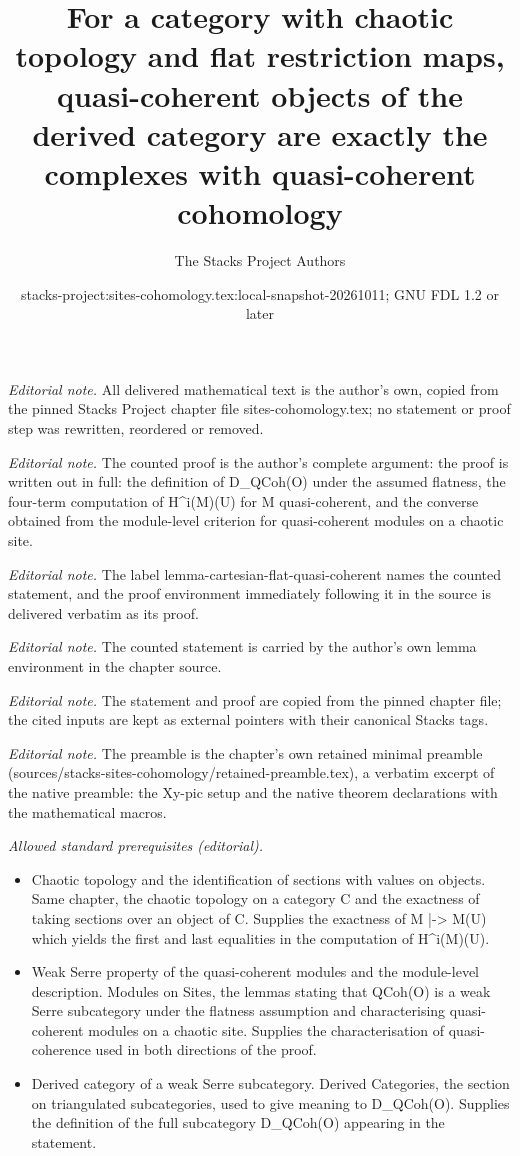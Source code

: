 \documentclass[10pt,a4paper]{amsart}
\title{For a category with chaotic topology and flat restriction maps, quasi-coherent objects of the derived category are exactly the complexes with quasi-coherent cohomology}
\author{The Stacks Project Authors}
\date{stacks-project:sites-cohomology.tex:local-snapshot-20261011; GNU FDL 1.2 or later}
\theoremstyle{plain}
\theoremstyle{definition}
\theoremstyle{remark}
\numberwithin{equation}{subsection}
\begin{document}
\maketitle
\noindent\textit{Editorial note.} All delivered mathematical text is the author's own, copied from the pinned Stacks Project chapter file sites-cohomology.tex; no statement or proof step was rewritten, reordered or removed.\par\medskip
\noindent\textit{Editorial note.} The counted proof is the author's complete argument: the proof is written out in full: the definition of D\_QCoh(O) under the assumed flatness, the four-term computation of H\textasciicircum{}i(M)(U) for M quasi-coherent, and the converse obtained from the module-level criterion for quasi-coherent modules on a chaotic site.\par\medskip
\noindent\textit{Editorial note.} The label lemma-cartesian-flat-quasi-coherent names the counted statement, and the proof environment immediately following it in the source is delivered verbatim as its proof.\par\medskip
\noindent\textit{Editorial note.} The counted statement is carried by the author's own lemma environment in the chapter source.\par\medskip
\noindent\textit{Editorial note.} The statement and proof are copied from the pinned chapter file; the cited inputs are kept as external pointers with their canonical Stacks tags.\par\medskip
\noindent\textit{Editorial note.} The preamble is the chapter's own retained minimal preamble (sources/stacks-sites-cohomology/retained-preamble.tex), a verbatim excerpt of the native preamble: the Xy-pic setup and the native theorem declarations with the mathematical macros.\par\medskip
\noindent\textit{Allowed standard prerequisites (editorial).}\begin{itemize}
\item Chaotic topology and the identification of sections with values on objects. Same chapter, the chaotic topology on a category C and the exactness of taking sections over an object of C. Supplies the exactness of M |-> M(U) which yields the first and last equalities in the computation of H\textasciicircum{}i(M)(U).
\item Weak Serre property of the quasi-coherent modules and the module-level description. Modules on Sites, the lemmas stating that QCoh(O) is a weak Serre subcategory under the flatness assumption and characterising quasi-coherent modules on a chaotic site. Supplies the characterisation of quasi-coherence used in both directions of the proof.
\item Derived category of a weak Serre subcategory. Derived Categories, the section on triangulated subcategories, used to give meaning to D\_QCoh(O). Supplies the definition of the full subcategory D\_QCoh(O) appearing in the statement.
\end{itemize}\medskip
\end{document}
